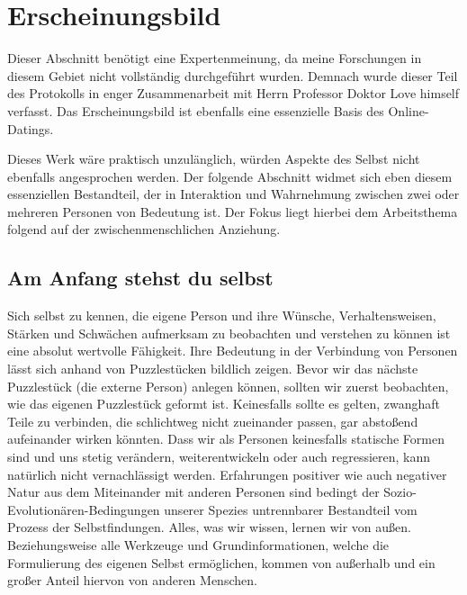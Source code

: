 \section{Erscheinungsbild}
\label{chapter-main-erscheinung}

Dieser Abschnitt benötigt eine Expertenmeinung, da meine Forschungen in diesem Gebiet nicht vollständig durchgeführt wurden.
Demnach wurde dieser Teil des Protokolls in enger Zusammenarbeit mit Herrn Professor Doktor Love himself verfasst.
Das Erscheinungsbild ist ebenfalls eine essenzielle Basis des Online-Datings.

Dieses Werk wäre praktisch unzulänglich, würden Aspekte des Selbst nicht ebenfalls angesprochen werden. Der folgende Abschnitt widmet sich eben diesem essenziellen Bestandteil, der in Interaktion und Wahrnehmung zwischen zwei oder mehreren Personen von Bedeutung ist. Der Fokus liegt hierbei dem Arbeitsthema folgend auf der zwischenmenschlichen Anziehung.

\subsection{Am Anfang stehst du selbst}
Sich selbst zu kennen, die eigene Person und ihre Wünsche, Verhaltensweisen, Stärken und Schwächen aufmerksam zu beobachten und verstehen zu können ist eine absolut wertvolle Fähigkeit. Ihre Bedeutung in der Verbindung von Personen lässt sich anhand von Puzzlestücken bildlich zeigen. Bevor wir das nächste Puzzlestück (die externe Person) anlegen können, sollten wir zuerst beobachten, wie das eigenen Puzzlestück geformt ist. Keinesfalls sollte es gelten, zwanghaft Teile zu verbinden, die schlichtweg nicht zueinander passen, gar abstoßend aufeinander wirken könnten. Dass wir als Personen keinesfalls statische Formen sind und uns stetig verändern, weiterentwickeln oder auch regressieren, kann natürlich nicht vernachlässigt werden. Erfahrungen positiver wie auch negativer Natur aus dem Miteinander mit anderen Personen sind bedingt der Sozio-Evolutionären-Bedingungen unserer Spezies untrennbarer Bestandteil vom Prozess der Selbstfindungen. Alles, was wir wissen, lernen wir von außen. Beziehungsweise alle Werkzeuge und Grundinformationen, welche die Formulierung des eigenen Selbst ermöglichen, kommen von außerhalb und ein großer Anteil  hiervon von anderen Menschen. 

